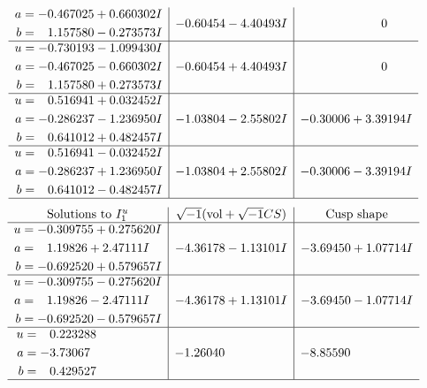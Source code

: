\documentclass[1p]{elsarticle_modified}
\theoremstyle{definition}
\newcommand{\I}{\sqrt{-1}}
\begin{document}
$$\begin{array}{c|c|c}
\begin{aligned}
a &= -0.467025 + 0.660302 I \\
b &= \phantom{-}1.157580 - 0.273573 I\end{aligned}
 & -0.60454 - 4.40493 I & \phantom{-0.000000 } 0 \\ \hline\begin{aligned}
u &= -0.730193 - 1.099430 I \\
a &= -0.467025 - 0.660302 I \\
b &= \phantom{-}1.157580 + 0.273573 I\end{aligned}
 & -0.60454 + 4.40493 I & \phantom{-0.000000 } 0 \\ \hline\begin{aligned}
u &= \phantom{-}0.516941 + 0.032452 I \\
a &= -0.286237 - 1.236950 I \\
b &= \phantom{-}0.641012 + 0.482457 I\end{aligned}
 & -1.03804 - 2.55802 I & -0.30006 + 3.39194 I \\ \hline\begin{aligned}
u &= \phantom{-}0.516941 - 0.032452 I \\
a &= -0.286237 + 1.236950 I \\
b &= \phantom{-}0.641012 - 0.482457 I\end{aligned}
 & -1.03804 + 2.55802 I & -0.30006 - 3.39194 I\\
 \hline 
 \end{array}$$\newpage$$\begin{array}{c|c|c}  
\text{Solutions to }I^u_{1}& \I (\text{vol} + \sqrt{-1}CS) & \text{Cusp shape}\\
 \hline 
\begin{aligned}
u &= -0.309755 + 0.275620 I \\
a &= \phantom{-}1.19826 + 2.47111 I \\
b &= -0.692520 + 0.579657 I\end{aligned}
 & -4.36178 - 1.13101 I & -3.69450 + 1.07714 I \\ \hline\begin{aligned}
u &= -0.309755 - 0.275620 I \\
a &= \phantom{-}1.19826 - 2.47111 I \\
b &= -0.692520 - 0.579657 I\end{aligned}
 & -4.36178 + 1.13101 I & -3.69450 - 1.07714 I \\ \hline\begin{aligned}
u &= \phantom{-}0.223288\phantom{ +0.000000I} \\
a &= -3.73067\phantom{ +0.000000I} \\
b &= \phantom{-}0.429527\phantom{ +0.000000I}\end{aligned}
 & -1.26040\phantom{ +0.000000I} & -8.85590\phantom{ +0.000000I}\\
 \hline 
 \end{array}$$\newpage
\end{document}
